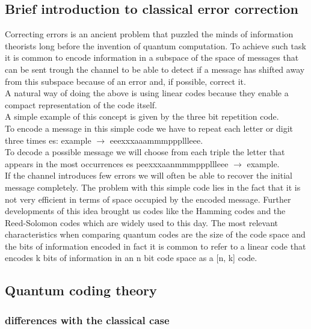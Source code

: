 \documentclass{article}
\begin{document}
\subsection{Brief introduction to classical error correction}

Correcting errors is an ancient problem that puzzled the minds of
information theorists long before the invention of quantum computation.
To achieve such task it is common to encode information in a subspace of
the space of messages that can be sent trough the channel to be able to
detect if a message has shifted away from this subspace because of an
error and, if possible, correct it.\\
A natural way of doing the above is using linear codes because they
enable a compact representation of the code itself.\\
A simple example of this concept is given by the three bit repetition
code.\\
To encode a message in this simple code we have to repeat each letter
or digit three times es: example $\rightarrow$ eeexxxaaammmpppllleee.\\
To decode a possible message we will choose from each triple the
letter that appears in the most occurrences es peexxxaanmmmpppllleee $\rightarrow$ example. \\
If the channel introduces few errors we will often be able to recover
the initial message completely.
The problem with this simple code lies in the fact that it is not very
efficient in terms of space occupied by the encoded message.
Further developments of this idea brought us codes like the Hamming
codes and the Reed-Solomon codes which are widely used to this day.
The most relevant characteristics when comparing quantum codes are
the size of the code space and the bits of information encoded in fact
it is common to refer to a linear code that encodes k bits of information
in an n bit code space as a [n, k] code.

\subsection{Quantum coding theory}

\subsubsection{differences with the classical case}
\end{document}
